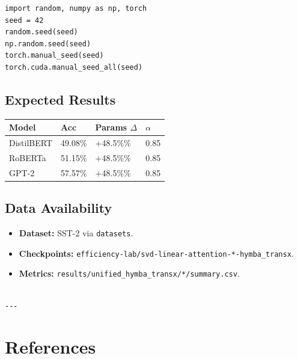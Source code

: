 \begin{lstlisting}
import random, numpy as np, torch
seed = 42
random.seed(seed)
np.random.seed(seed)
torch.manual_seed(seed)
torch.cuda.manual_seed_all(seed)
\end{lstlisting}

\subsection{Expected Results}

\begin{table}[H]
\centering
\small
\begin{tabular}{llll}
\toprule
\textbf{Model} & \textbf{Acc} & \textbf{Params $\Delta$} & \textbf{$\alpha$} \\
\midrule
DistilBERT & 49.08\% & +48.5\%\% & 0.85 \\
RoBERTa & 51.15\% & +48.5\%\% & 0.85 \\
GPT-2 & 57.57\% & +48.5\%\% & 0.85 \\
\bottomrule
\end{tabular}
\end{table}

\subsection{Data Availability}

\begin{itemize}
\item \textbf{Dataset:} SST-2 via \texttt{datasets}.
\item \textbf{Checkpoints:} \texttt{efficiency-lab/svd-linear-attention-*-hymba\_transx}.
\item \textbf{Metrics:} \texttt{results/unified\_hymba\_transx/*/summary.csv}.
\end{itemize}
\begin{lstlisting}

---
\end{lstlisting}

\section{References}

